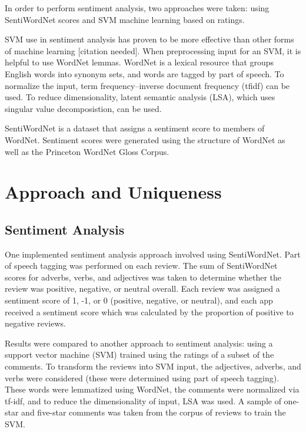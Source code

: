 \documentclass{acm_proc_article-sp}
\begin{document}
In order to perform sentiment analysis, two approaches were taken: using SentiWordNet scores and SVM machine learning based on ratings.

SVM use in sentiment analysis has proven to be more effective than other forms of machine learning [citation needed].  When preprocessing input for an SVM, it is helpful to use WordNet lemmas.  WordNet is a lexical resource that groups English words into synonym sets, and words are tagged by part of speech.  To normalize the input, term frequency--inverse document frequency (tfidf) can be used.  To reduce dimensionality, latent semantic analysis (LSA), which uses singular value decomposistion, can be used.

SentiWordNet is a dataset that assigns a sentiment score to members of WordNet.  Sentiment scores were generated using the structure of WordNet as well as the Princeton WordNet Gloss Corpus.


\section{Approach and Uniqueness}

\subsection{Sentiment Analysis}
One implemented sentiment analysis approach involved using SentiWordNet.  Part of speech tagging was performed on each review. The sum of SentiWordNet scores for adverbs, verbs, and adjectives was taken to determine whether the review was positive, negative, or neutral overall.  Each review was assigned a sentiment score of 1, -1, or 0 (positive, negative, or neutral), and each app received a sentiment score which was calculated by the proportion of positive to negative reviews.

Results were compared to another approach to sentiment analysis: using a support vector machine (SVM) trained using the ratings of a subset of the comments.  To transform the reviews into SVM input, the adjectives, adverbs, and verbs were considered (these were determined using part of speech tagging).  These words were lemmatized using WordNet, the comments were normalized via tf-idf, and to reduce the dimensionality of input, LSA was used.  A sample of one-star and five-star comments was taken from the corpus of reviews to train the SVM.
\end{document}
